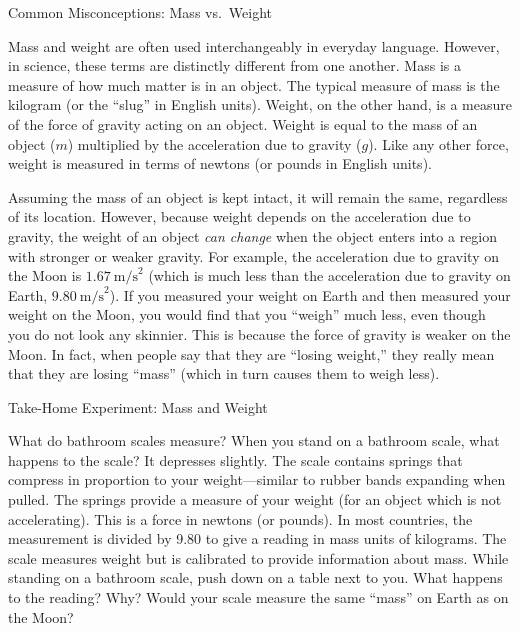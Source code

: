 \documentclass[
]{book}
\newenvironment{note}{}{}
\begin{document}
\hypertarget{fs-id1570965}{}
\begin{note}

Common Misconceptions: Mass vs.~Weight

Mass and weight are often used interchangeably in everyday language.
However, in science, these terms are distinctly different from one
another. Mass is a measure of how much matter is in an object. The
typical measure of mass is the kilogram (or the ``slug'' in English
units). Weight, on the other hand, is a measure of the force of gravity
acting on an object. Weight is equal to the mass of an object (\(m{}\))
multiplied by the acceleration due to gravity (\(g{}\)). Like any other
force, weight is measured in terms of newtons (or pounds in English
units).

Assuming the mass of an object is kept intact, it will remain the same,
regardless of its location. However, because weight depends on the
acceleration due to gravity, the weight of an object \emph{can change} when
the object enters into a region with stronger or weaker gravity. For
example, the acceleration due to gravity on the Moon is
\({1.67\ \text{m/s}^{2}}{}\) (which is much less than the acceleration due
to gravity on Earth, \({9.80\ \text{m/s}^{2}}{}\)). If you measured your
weight on Earth and then measured your weight on the Moon, you would
find that you ``weigh'' much less, even though you do not look any
skinnier. This is because the force of gravity is weaker on the Moon. In
fact, when people say that they are ``losing weight,'' they really mean
that they are losing ``mass'' (which in turn causes them to weigh less).

\end{note}

\hypertarget{fs-id3245519}{}
\begin{note}

Take-Home Experiment: Mass and Weight

What do bathroom scales measure? When you stand on a bathroom scale,
what happens to the scale? It depresses slightly. The scale contains
springs that compress in proportion to your weight---similar to rubber
bands expanding when pulled. The springs provide a measure of your
weight (for an object which is not accelerating). This is a force in
newtons (or pounds). In most countries, the measurement is divided by
9.80 to give a reading in mass units of kilograms. The scale measures
weight but is calibrated to provide information about mass. While
standing on a bathroom scale, push down on a table next to you. What
happens to the reading? Why? Would your scale measure the same ``mass'' on
Earth as on the Moon?

\end{note}
\end{document}
